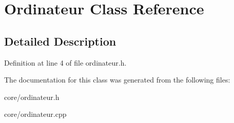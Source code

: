 \hypertarget{class_ordinateur}{
\section{Ordinateur Class Reference}
\label{class_ordinateur}
}


\subsection{Detailed Description}


Definition at line 4 of file ordinateur.h.



The documentation for this class was generated from the following files:\begin{DoxyCompactItemize}
\item 
core/ordinateur.h\item 
core/ordinateur.cpp\end{DoxyCompactItemize}
